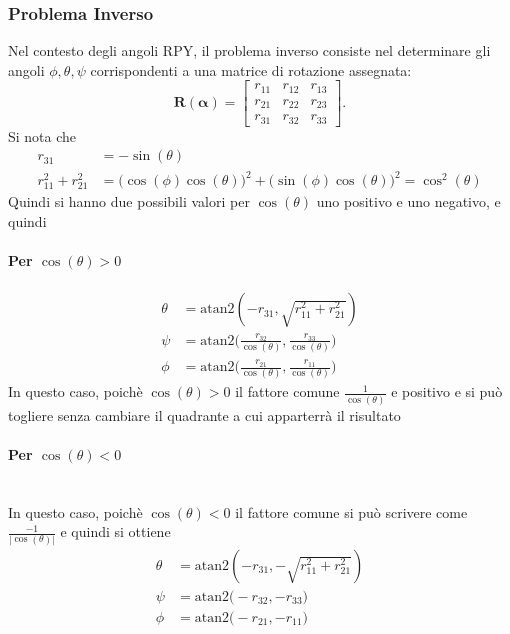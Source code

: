 \documentclass[11pt, a4paper]{report}
\begin{document}
\newpage
\subsubsection{Problema Inverso}
Nel contesto degli angoli RPY, il problema inverso consiste nel determinare gli angoli $\phi, \theta, \psi$ corrispondenti a una matrice di rotazione assegnata:
\[
    \mathbf{R}(\boldsymbol{\alpha}) =
    \begin{bmatrix}
        r_{11} & r_{12} & r_{13}\\
        r_{21} & r_{22} & r_{23}\\
        r_{31} & r_{32} & r_{33}
    \end{bmatrix}.
\]
Si nota che
\begin{align*}
    r_{31} &= -\sin(\theta)\\
    r_{11}^{2} + r_{21}^{2} &= \bigl( \cos(\phi)\cos(\theta) \bigr)^{2} + \bigl( \sin(\phi)\cos(\theta) \bigr)^{2} = \cos^{2}(\theta)
\end{align*}
Quindi si hanno due possibili valori per $\cos(\theta)$ uno positivo e uno negativo, e quindi
\paragraph{Per $\cos(\theta) > 0$}
\begin{align*}
    \theta &= \text{atan2}\left(-r_{31}, \sqrt{r_{11}^2 + r_{21}^2}\right) \\
    \psi &= \text{atan2}\biggl(\frac{r_{32}}{\cos(\theta)}, \frac{r_{33}}{\cos(\theta)}\biggr)\\
    \phi &= \text{atan2}\biggl(\frac{r_{21}}{\cos(\theta)}, \frac{r_{11}}{\cos(\theta)}\biggr)
\end{align*}
In questo caso, poichè $\cos(\theta) > 0$ il fattore comune $\frac{1}{\cos(\theta)}$ e positivo e si può togliere senza cambiare il quadrante a cui apparterrà il risultato
\paragraph{Per $\cos(\theta) < 0$}\mbox{}\\
In questo caso, poichè $\cos(\theta) < 0$ il fattore comune si può scrivere come $\frac{-1}{|\cos(\theta)|}$ e quindi si ottiene
\begin{align*}
    \theta &= \text{atan2}\left(-r_{31}, -\sqrt{r_{11}^2 + r_{21}^2}\right) \\
    \psi &= \text{atan2}\biggl(-r_{32}, -r_{33}\biggr)\\
    \phi &= \text{atan2}\biggl(-r_{21}, -r_{11}\biggr)
\end{align*}
\end{document}
